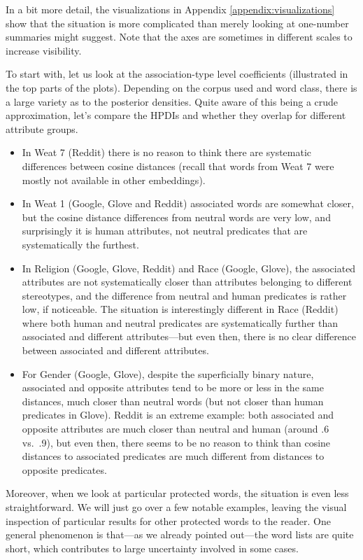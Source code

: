 \documentclass[
  12pt,
  dvipsnames,enabledeprecatedfontcommands]{scrartcl}
\begin{document}
In a bit more detail, the visualizations in Appendix
\ref{appendix:visualizations} show that the situation is more
complicated than merely looking at one-number summaries might suggest.
Note that the axes are sometimes in different scales to increase
visibility.

To start with, let us look at the association-type level coefficients
(illustrated in the top parts of the plots). Depending on the corpus
used and word class, there is a large variety as to the posterior
densities. Quite aware of this being a crude approximation, let's
compare the HPDIs and whether they overlap for different attribute
groups.

\begin{itemize}
\item
  In Weat 7 (Reddit) there is no reason to think there are systematic
  differences between cosine distances (recall that words from Weat 7
  were mostly not available in other embeddings).
\item
  In Weat 1 (Google, Glove and Reddit) associated words are somewhat
  closer, but the cosine distance differences from neutral words are
  very low, and surprisingly it is human attributes, not neutral
  predicates that are systematically the furthest.
\item
  In Religion (Google, Glove, Reddit) and Race (Google, Glove), the
  associated attributes are not systematically closer than attributes
  belonging to different stereotypes, and the difference from neutral
  and human predicates is rather low, if noticeable. The situation is
  interestingly different in Race (Reddit) where both human and neutral
  predicates are systematically further than associated and different
  attributes---but even then, there is no clear difference between
  associated and different attributes.
\item
  For Gender (Google, Glove), despite the superficially binary nature,
  associated and opposite attributes tend to be more or less in the same
  distances, much closer than neutral words (but not closer than human
  predicates in Glove). Reddit is an extreme example: both associated
  and opposite attributes are much closer than neutral and human (around
  .6 vs.~.9), but even then, there seems to be no reason to think than
  cosine distances to associated predicates are much different from
  distances to opposite predicates.
\end{itemize}

Moreover, when we look at particular protected words, the situation is
even less straightforward. We will just go over a few notable examples,
leaving the visual inspection of particular results for other protected
words to the reader. One general phenomenon is that---as we already
pointed out---the word lists are quite short, which contributes to large
uncertainty involved in some cases.
\end{document}
